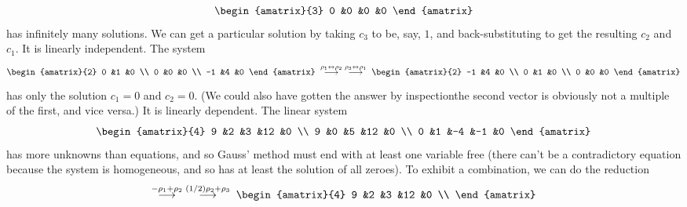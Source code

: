 \begin{exercises}
\begin{answer}
\begin{exparts}
\begin{equation*}
\begin{amatrix}{3}
              0  &0  &0   &0
            \end{amatrix}
          \end{equation*}
          has infinitely many solutions.
          We can get a particular solution by taking $c_3$ to be, say,
          $1$, and back-substituting to get the resulting $c_2$ and $c_1$.
        \partsitem It is linearly independent.
          The system
          \begin{equation*}
            \begin{amatrix}{2}
              0  &1  &0  \\
              0  &0  &0  \\
              -1 &4  &0
            \end{amatrix}
            \;\grstep{\rho_1\leftrightarrow\rho_2}
            \;\grstep{\rho_3\leftrightarrow\rho_1}\;
            \begin{amatrix}{2}
              -1 &4  &0  \\
              0  &1  &0  \\
              0  &0  &0  
            \end{amatrix}
          \end{equation*}
          has only the solution $c_1=0$ and $c_2=0$.
          (We could also have gotten the answer by inspection\Dash the second
          vector is obviously not a multiple of the first, and vice versa.)
        \partsitem It is linearly dependent.
          The linear system
          \begin{equation*}
            \begin{amatrix}{4}
              9  &2  &3  &12  &0  \\
              9  &0  &5  &12  &0  \\
              0  &1  &-4 &-1  &0
            \end{amatrix}
          \end{equation*}
          has more unknowns than equations, and so Gauss' method
          must end with at least one variable free (there can't be a 
          contradictory equation because the system is homogeneous, and so
          has at least the solution of all zeroes).
          To exhibit a combination, we can do the reduction 
          \begin{equation*}
            \grstep{-\rho_1+\rho_2}
            \;\grstep{(1/2)\rho_2+\rho_3}\;
            \begin{amatrix}{4}
              9  &2  &3  &12  &0  \\

\end{amatrix}
\end{equation*}
\end{exparts}
\end{answer}
\end{exercises}
